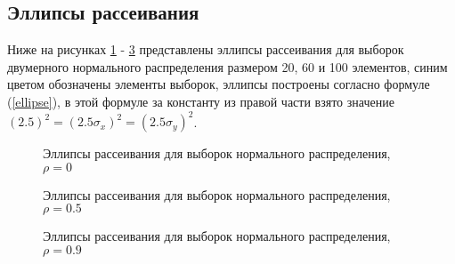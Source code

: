 \documentclass[12pt]{article}
\begin{document}
\subsection{Эллипсы рассеивания}
Ниже на рисунках \ref{rho_0} - \ref{rho_09} представлены эллипсы рассеивания для выборок двумерного нормального распределения размером 20, 60 и 100 элементов, синим цветом обозначены элементы выборок, эллипсы построены согласно формуле (\ref{ellipse}), в этой формуле за константу из правой части взято значение $(2.5)^2 = (2.5\sigma_x)^2 = (2.5\sigma_y)^2$.
\begin{figure}[h]
    \begin{minipage}[h]{0.5\linewidth}
    \end{minipage}
    \begin{minipage}[h]{0.5\linewidth}
    \end{minipage}
    \begin{minipage}[h]{0.5\linewidth}
    \end{minipage}
    \caption{Эллипсы рассеивания для выборок нормального распределения, $\rho = 0$}
    \label{rho_0}
\end{figure}

\begin{figure}[h]
    \begin{minipage}[h]{0.5\linewidth}
    \end{minipage}
    \begin{minipage}[h]{0.5\linewidth}
    \end{minipage}
    \begin{minipage}[h]{0.5\linewidth}
    \end{minipage}
    \caption{Эллипсы рассеивания для выборок нормального распределения, $\rho = 0.5$}
    \label{rho_05}
\end{figure}

\begin{figure}[h!]
    \begin{minipage}[h]{0.5\linewidth}
    \end{minipage}
    \begin{minipage}[h]{0.5\linewidth}
    \end{minipage}
    \begin{minipage}[h]{0.5\linewidth}
    \end{minipage}
    \caption{Эллипсы рассеивания для выборок нормального распределения, $\rho = 0.9$}
    \label{rho_09}
\end{figure}
\end{document}
